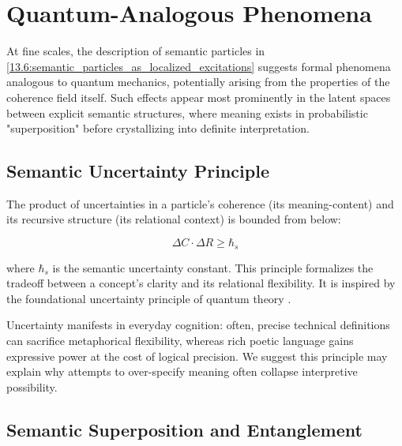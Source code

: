 \section{Quantum-Analogous Phenomena}
\label{13.7:quantum_analogous_phenomena}

At fine scales, the description of semantic particles in \ref{13.6:semantic_particles_as_localized_excitations} suggests formal phenomena analogous to quantum mechanics, potentially arising from the properties of the coherence field itself. Such effects appear most prominently in the latent spaces between explicit semantic structures, where meaning exists in probabilistic "superposition" before crystallizing into definite interpretation.


\subsection{Semantic Uncertainty Principle}
\label{13.7.1:semantic_uncertainty_principle}

The product of uncertainties in a particle's coherence (its meaning-content) and its recursive structure (its relational context) is bounded from below:

\begin{equation}
\Delta C \cdot \Delta R \geq \hbar_s
\end{equation}

where \(\hbar_s\) is the semantic uncertainty constant. This principle formalizes the tradeoff between a concept's clarity and its relational flexibility. It is inspired by the foundational uncertainty principle of quantum theory \autocite{Heisenberg1927, WheelerZurek1983}.

Uncertainty manifests in everyday cognition: often, precise technical definitions can sacrifice metaphorical flexibility, whereas rich poetic language gains expressive power at the cost of logical precision. We suggest this principle may explain why attempts to over-specify meaning often collapse interpretive possibility.


\subsection{Semantic Superposition and Entanglement}
\label{13.7.2:semantic_superposition_and_entanglement}

